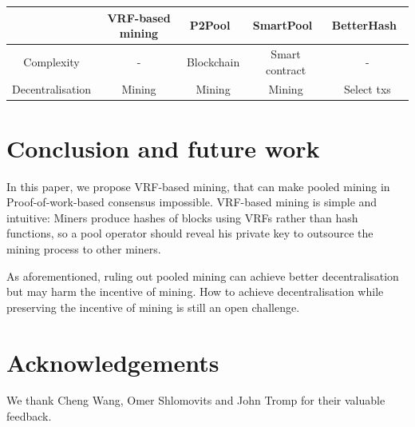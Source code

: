 \documentclass[a0,portrait]{a0poster}
\begin{document}
\begin{multicols}{2}
    \begin{center}
        \begin{tabular}{ccccc}
            \hline
                             & VRF-based mining & P2Pool~\cite{voight2011p2pool} & SmartPool~\cite{luu2017smartpool} & BetterHash~\cite{draft-bip-BetterHash} \\ \hline
            Complexity       & -                & Blockchain                     & Smart contract                    & -                                      \\
            Decentralisation & Mining           & Mining                         & Mining                            & Select txs                             \\ \hline
        \end{tabular}
    \end{center}


    \section*{Conclusion and future work}

    In this paper, we propose VRF-based mining, that can make pooled mining in Proof-of-work-based consensus impossible.
    VRF-based mining is simple and intuitive: Miners produce hashes of blocks using VRFs rather than hash functions, so a pool operator should reveal his private key to outsource the mining process to other miners.

    As aforementioned, ruling out pooled mining can achieve better decentralisation but may harm the incentive of mining.
    How to achieve decentralisation while preserving the incentive of mining is still an open challenge.




    \section*{Acknowledgements}

    We thank Cheng Wang, Omer Shlomovits and John Tromp for their valuable feedback.


\end{multicols}
\end{document}
